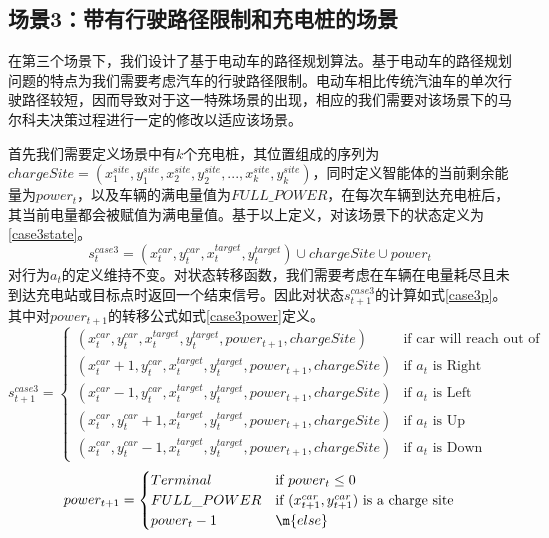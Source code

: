 \documentclass{standalone}
\begin{document}
\subsection{场景3：带有行驶路径限制和充电桩的场景}
在第三个场景下，我们设计了基于电动车的路径规划算法。基于电动车的路径规划问题的特点为我们需要考虑汽车的行驶路径限制。电动车相比传统汽油车的单次行驶路径较短，因而导致对于这一特殊场景的出现，相应的我们需要对该场景下的马尔科夫决策过程进行一定的修改以适应该场景。\par
首先我们需要定义场景中有$k$个充电桩，其位置组成的序列为$chargeSite = (x_1^{site}, y_1^{site}, x_2^{site}, y_2^{site}, ... , x_k^{site}, y_k^{site})$，同时定义智能体的当前剩余能量为$power_t$，以及车辆的满电量值为$FULL\_POWER$，在每次车辆到达充电桩后，其当前电量都会被赋值为满电量值。基于以上定义，对该场景下的状态定义为\ref{case3state}。
    \begin{equation}
    \label{case3state}
        s_t^{case3} = (x_t^{car}, y_t^{car}, x^{target}_t, y^{target}_t) \cup chargeSite \cup power_t
    \end{equation}
对行为$a_t$的定义维持不变。对状态转移函数，我们需要考虑在车辆在电量耗尽且未到达充电站或目标点时返回一个结束信号。因此对状态$s_{t+1}^{case3}$的计算如式\ref{case3p}。其中对$power_{t+1}$的转移公式如式\ref{case3power}定义。
    \begin{equation}
    \label{case3p}
    s_{t+1}^{case3} = \begin{cases}
    (x_t^{car}, y_t^{car}, x^{target}_t, y^{target}_t, power_{t+1}, chargeSite) &\mbox{if car will reach out of map}\\
    (x_t^{car} + 1, y_t^{car}, x^{target}_t, y^{target}_t, power_{t+1}, chargeSite) &\mbox{if $a_t$ is Right}\\
    (x_t^{car} - 1, y_t^{car}, x^{target}_t, y^{target}_t, power_{t+1}, chargeSite) &\mbox{if $a_t$ is Left}\\
    (x_t^{car}, y_t^{car} + 1, x^{target}_t, y^{target}_t, power_{t+1}, chargeSite) &\mbox{if $a_t$ is Up}\\
    (x_t^{car}, y_t^{car} - 1, x^{target}_t, y^{target}_t, power_{t+1}, chargeSite) &\mbox{if $a_t$ is Down}
    \end{cases}
    \end{equation}
    \begin{equation}
        \label{case3power}
        power_{t+1} = \begin{cases}
        Terminal &\mbox{if $power_t \leq 0$}\\
        FULL\_POWER &\mbox{if $(x_{t+1}^{car}, y_{t+1}^{car})$ is a charge site}\\
        power_{t} - 1 &\m{else}
        \end{cases}
    \end{equation}
\end{document}
